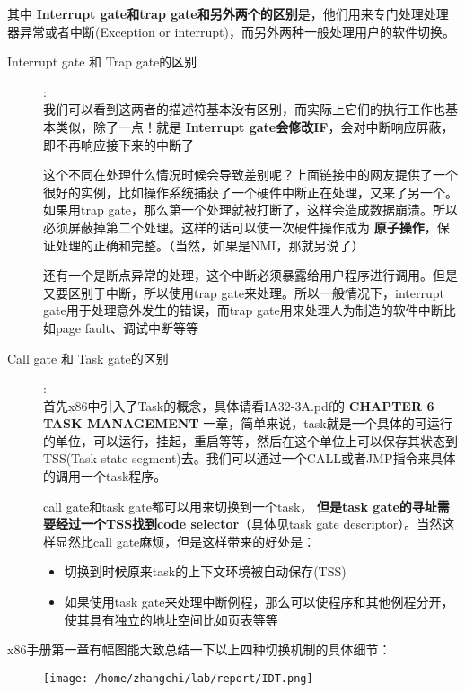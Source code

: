 \documentclass{article}
\newcommand{\highlight}[1]{{\bfseries \color{red}  #1}}
\begin{document}
\begin{CJK*}{UTF8}{gkai}
其中\highlight{Interrupt gate和trap gate和另外两个的区别}是，他们用来专门处理处理器异常或者中断(Exception or interrupt)，而另外两种一般处理用户的软件切换。


\begin{description}
\item[Interrupt gate 和 Trap gate的区别]: \\
我们可以看到这两者的描述符基本没有区别，而实际上它们的执行工作也基本类似，除了一点！就是\highlight{Interrupt gate会修改IF}，会对中断响应屏蔽，即不再响应接下来的中断了

这个不同在处理什么情况时候会导致差别呢？上面链接中的网友提供了一个很好的实例，比如操作系统捕获了一个硬件中断正在处理，又来了另一个。如果用trap gate，那么第一个处理就被打断了，这样会造成数据崩溃。所以必须屏蔽掉第二个处理。这样的话可以使一次硬件操作成为\highlight{原子操作}，保证处理的正确和完整。（当然，如果是NMI，那就另说了）


还有一个是断点异常的处理，这个中断必须暴露给用户程序进行调用。但是又要区别于中断，所以使用trap gate来处理。所以一般情况下，interrupt gate用于处理意外发生的错误，而trap gate用来处理人为制造的软件中断比如page fault、调试中断等等

\item[Call gate 和 Task gate的区别]: \\
首先x86中引入了Task的概念，具体请看IA32-3A.pdf的 {\ttfamily \bfseries CHAPTER 6 TASK MANAGEMENT } 一章，简单来说，task就是一个具体的可运行的单位，可以运行，挂起，重启等等，然后在这个单位上可以保存其状态到TSS(Task-state segment)去。我们可以通过一个CALL或者JMP指令来具体的调用一个task程序。

call gate和task gate都可以用来切换到一个task，\highlight{但是task gate的寻址需要经过一个TSS找到code selector}（具体见task gate descriptor）。当然这样显然比call gate麻烦，但是这样带来的好处是：

\begin{itemize}
\item{切换到时候原来task的上下文环境被自动保存(TSS)}
\item{如果使用task gate来处理中断例程，那么可以使程序和其他例程分开，使其具有独立的地址空间比如页表等等}
\end{itemize}

\end{description}

x86手册第一章有幅图能大致总结一下以上四种切换机制的具体细节：


\begin{figure}[htp]
\centering
\texttt{[image: /home/zhangchi/lab/report/IDT.png]}
\end{figure}


\end{CJK*}
\end{document}
